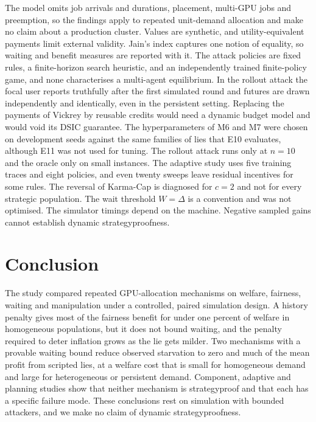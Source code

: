 \documentclass{article}
\theoremstyle{plain}
\theoremstyle{definition}
\begin{document}
The model omits job arrivals and durations, placement, multi-GPU jobs and preemption, so the findings apply to repeated unit-demand allocation and make no claim about a production cluster.
Values are synthetic, and utility-equivalent payments limit external validity.
Jain's index captures one notion of equality, so waiting and benefit measures are reported with it.
The attack policies are fixed rules, a finite-horizon search heuristic, and an independently trained finite-policy game, and none characterises a multi-agent equilibrium.
In the rollout attack the focal user reports truthfully after the first simulated round and futures are drawn independently and identically, even in the persistent setting.
Replacing the payments of Vickrey by reusable credits would need a dynamic budget model and would void its DSIC guarantee.
The hyperparameters of M6 and M7 were chosen on development seeds against the same families of lies that E10 evaluates, although E11 was not used for tuning.
The rollout attack runs only at $n=10$ and the oracle only on small instances.
The adaptive study uses five training traces and eight policies, and even twenty sweeps leave residual incentives for some rules.
The reversal of Karma-Cap is diagnosed for $c=2$ and not for every strategic population.
The wait threshold $W=\Delta$ is a convention and was not optimised.
The simulator timings depend on the machine.
Negative sampled gains cannot establish dynamic strategyproofness.

\section{Conclusion}
\label{sec:conclusion}

The study compared repeated GPU-allocation mechanisms on welfare, fairness, waiting and manipulation under a controlled, paired simulation design.
A history penalty gives most of the fairness benefit for under one percent of welfare in homogeneous populations, but it does not bound waiting, and the penalty required to deter inflation grows as the lie gets milder.
Two mechanisms with a provable waiting bound reduce observed starvation to zero and much of the mean profit from scripted lies, at a welfare cost that is small for homogeneous demand and large for heterogeneous or persistent demand.
Component, adaptive and planning studies show that neither mechanism is strategyproof and that each has a specific failure mode.
These conclusions rest on simulation with bounded attackers, and we make no claim of dynamic strategyproofness.
\end{document}
